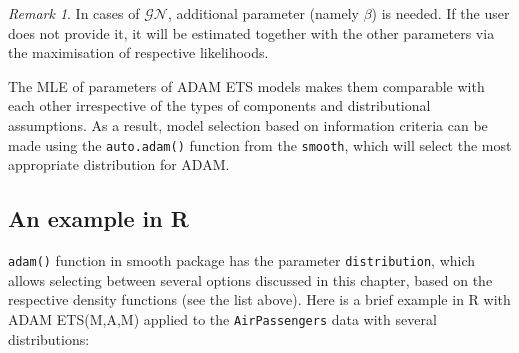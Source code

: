 \documentclass[]{book}
\theoremstyle{definition}
\theoremstyle{definition}
\theoremstyle{definition}
\theoremstyle{definition}
\theoremstyle{remark}
\newtheorem*{remark}{Remark}
\begin{document}
\begin{remark}
In cases of \(\mathcal{GN}\), additional parameter (namely \(\beta\)) is needed. If the user does not provide it, it will be estimated together with the other parameters via the maximisation of respective likelihoods.
\end{remark}

The MLE of parameters of ADAM ETS models makes them comparable with each other irrespective of the types of components and distributional assumptions. As a result, model selection based on information criteria can be made using the \texttt{auto.adam()} function from the \texttt{smooth}, which will select the most appropriate distribution for ADAM.

\hypertarget{an-example-in-r-1}{%
\subsection{An example in R}\label{an-example-in-r-1}}

\texttt{adam()} function in smooth package has the parameter \texttt{distribution}, which allows selecting between several options discussed in this chapter, based on the respective density functions (see the list above). Here is a brief example in R with ADAM ETS(M,A,M) applied to the \texttt{AirPassengers} data with several distributions:
\end{document}

